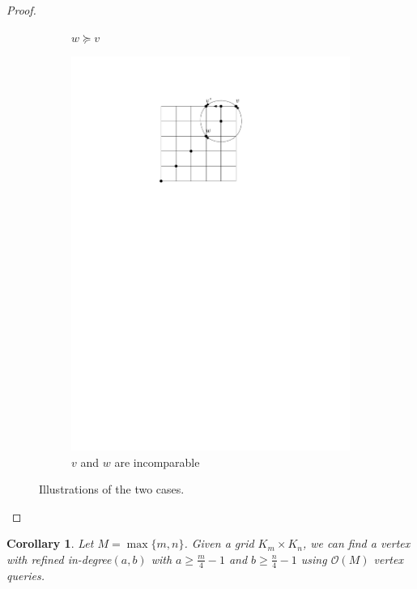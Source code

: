 \documentclass[a4paper,10pt]{article}
\newtheorem{corollary}{Corollary}
\newcommand{\indegree}{refined in-degree\xspace}
\begin{document}
\begin{proof}
\begin{figure}[htbp]
\begin{subfigure}[b]{0.4\textwidth}
           \caption{$w \succeq v$}
       \end{subfigure}
       \qquad \qquad
       \begin{subfigure}[b]{0.4\textwidth}
           \includegraphics[scale = 0.7]{seedlemma_fig2_cas2.pdf}
           \caption{$v$ and $w$ are incomparable}
       \end{subfigure}
       \caption{Illustrations of the two cases. }
       \label{fig:seedlem2}
   \end{figure}
\end{proof}

\begin{corollary}
 Let $M = \max\{m,n\}$. Given a grid $K_{m} \times K_{n}$, we can find a vertex with \indegree $(a,b)$ with $a \geq \frac{m}{4} - 1$ and  $b \geq \frac{n}{4} - 1$ using $\mathcal{O}(M)$ vertex queries.
\end{corollary}
\end{document}
